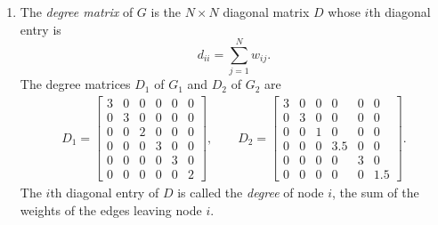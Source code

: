 \begin{enumerate}
\item The \emph{degree matrix} of $G$ is the $N \times N$ diagonal matrix $D$ whose $i$th diagonal entry is
\begin{equation}
d_{ii} = \sum_{j=1}^N w_{ij}.
\label{eq:degree-matrix-formula}
\end{equation}
The degree matrices $D_1$ of $G_1$ and $D_2$ of $G_2$ are
\begin{align*}
D_1 = \left[\begin{array}{cccccc}
3 & 0 & 0 & 0 & 0 & 0\\
0 & 3 & 0 & 0 & 0 & 0\\
0 & 0 & 2 & 0 & 0 & 0\\
0 & 0 & 0 & 3 & 0 & 0\\
0 & 0 & 0 & 0 & 3 & 0\\
0 & 0 & 0 & 0 & 0 & 2
\end{array}\right],
\qquad D_2 =
\left[\begin{array}{cccccc}
3 & 0 & 0 & 0 & 0 & 0\\
0 & 3 & 0 & 0 & 0 & 0\\
0 & 0 & 1 & 0 & 0 & 0\\
0 & 0 & 0 & 3.5 & 0 & 0\\
0 & 0 & 0 & 0 & 3 & 0\\
0 & 0 & 0 & 0 & 0 & 1.5
\end{array}\right].
\end{align*}
The $i$th diagonal entry of $D$ is called the \emph{degree} of node $i$, the sum of the weights of the edges leaving node $i$.


\end{enumerate}
